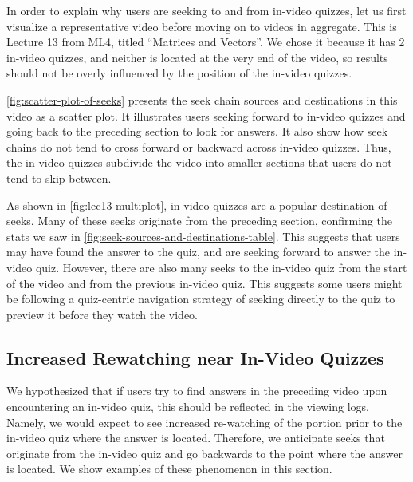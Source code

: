 \documentclass{sigchi}
\begin{document}
In order to explain why users are seeking to and from in-video quizzes, let us first visualize a representative video before moving on to videos in aggregate. This is Lecture 13 from ML4, titled ``Matrices and Vectors''. We chose it because it has 2 in-video quizzes, and neither is located at the very end of the video, so results should not be overly influenced by the position of the in-video quizzes.

\autoref{fig:scatter-plot-of-seeks} presents the seek chain sources and destinations in this video as a scatter plot. It illustrates users seeking forward to in-video quizzes and going back to the preceding section to look for answers. It also show how seek chains do not tend to cross forward or backward across in-video quizzes. Thus, the in-video quizzes subdivide the video into smaller sections that users do not tend to skip between.

As shown in \autoref{fig:lec13-multiplot}, in-video quizzes are a popular destination of seeks. Many of these seeks originate from the preceding section, confirming the stats we saw in \autoref{fig:seek-sources-and-destinations-table}. This suggests that users may have found the answer to the quiz, and are seeking forward to answer the in-video quiz. However, there are also many seeks to the in-video quiz from the start of the video and from the previous in-video quiz. This suggests some users might be following a quiz-centric navigation strategy of seeking directly to the quiz to preview it before they watch the video.


\subsection{Increased Rewatching near In-Video Quizzes}

We hypothesized that if users try to find answers in the preceding video upon encountering an in-video quiz, this should be reflected in the viewing logs. Namely, we would expect to see increased re-watching of the portion prior to the in-video quiz where the answer is located. Therefore, we anticipate seeks that originate from the in-video quiz and go backwards to the point where the answer is located. We show examples of these phenomenon in this section.
\end{document}
